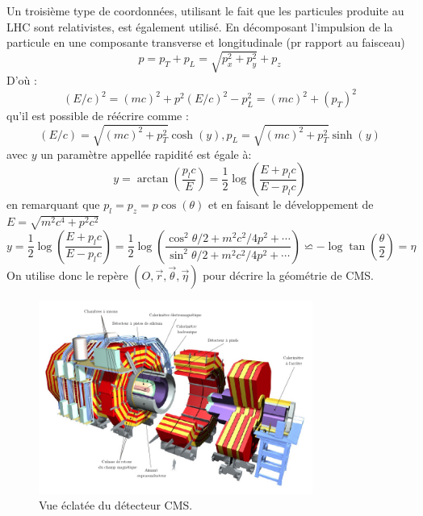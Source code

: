 Un troisième type de coordonnées, utilisant le fait que les particules produite au LHC sont relativistes, est également utilisé.
En décomposant l'impulsion de la particule en une composante transverse et longitudinale (pr rapport au faisceau)
\begin{equation}
p=p_{T}+p_{L}=\sqrt{p_{x}^{2}+p_{y}^{2}}+p_{z}
\end{equation}
D'où :
\begin{equation}
( E/c)^{2}=(mc)^{2}+p^{2} (E/c)^{2}-p_{L}^{2}=(mc)^{2}+(p_{T})^{2}
\end{equation}
qu'il est possible de réécrire comme :
\begin{equation}
\left( E/c \right)=\sqrt{\left( mc \right)^{2}+p_{T}^{2}}\cosh(y), p_{L}=\sqrt{\left( mc \right)^{2}+p_{T}^{2}}\sinh(y)
\end{equation}
avec $y$ un paramètre appellée rapidité est égale à:
\begin{equation}
y=\arctan\left(\frac{p_{l}c}{E}\right)=\frac{1}{2}\log\left(\frac{E+p_{l}c}{E-p_{l}c}\right)
\end{equation}
en remarquant que $p_{l}=p_{z}=p\cos(\theta)$ et en faisant le développement de $E=\sqrt{m^{2}c^{4}+p^{2}c^{2}}$
\begin{equation}
y=\frac{1}{2} \log\left(\frac{E+p_{l}c}{E-p_{l}c}\right)=\frac{1}{2}\log\left(\frac{\cos^2 \theta/2+m^{2}c^{2}/4p^{2}+\cdots}{\sin^2 \theta/2+m^{2}c^{2}/4p^{2}+\cdots}\right)\backsimeq-\log\tan\left(\frac{\theta}{2}\right)=\eta
\end{equation}
On utilise donc le repère $\left(O,\vec{r},\vec{\theta},\vec{\eta}\right)$ pour décrire la géométrie de CMS.
\begin{figure}
	\centering
	\includegraphics[width=0.8\textwidth]{CMS/cms.png}
	\caption{\label{cmsexploded}Vue éclatée du détecteur CMS.}
\end{figure}
